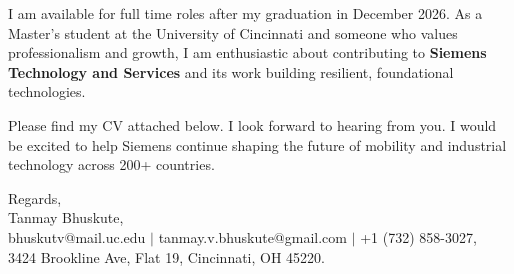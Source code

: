 \documentclass[11pt]{letter}
\begin{document}
\begin{letter}{}
I am available for full time roles after my graduation in December 2026. As a Master's student at the University of Cincinnati and someone who values professionalism and growth, I am enthusiastic about contributing to \textbf{Siemens Technology and Services} and its work building resilient, foundational technologies.

Please find my CV attached below. I look forward to hearing from you. I would be excited to help Siemens continue shaping the future of mobility and industrial technology across 200+ countries.

{\setlength{\parskip}{0pt}
Regards,\\
Tanmay Bhuskute,\\
bhuskutv@mail.uc.edu $\mid$ tanmay.v.bhuskute@gmail.com $\mid$ +1 (732) 858-3027,\\
3424 Brookline Ave, Flat 19, Cincinnati, OH 45220.
}

\end{letter}
\end{document}

